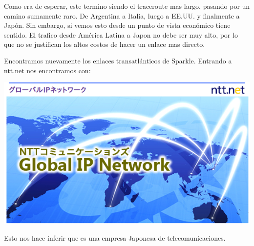\vspace{10px}

Como era de esperar, este termino siendo el traceroute mas largo, pasando por un camino sumamente raro. De Argentina a Italia, luego a EE.UU. y finalmente a Japón. Sin embargo, si vemos esto desde un punto de vista económico tiene sentido. El trafico desde América Latina a Japon no debe ser muy alto, por lo que no se justifican los altos costos de hacer un enlace mas directo.

Encontramos nuevamente los enlaces transatlánticos de Sparkle. Entrando a ntt.net nos encontramos con:

\includegraphics[width=\textwidth,keepaspectratio]{images/ntt}

Esto nos hace inferir que es una empresa Japonesa de telecomunicaciones.